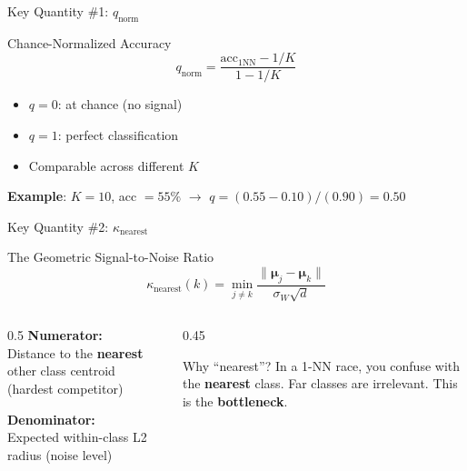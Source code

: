 \documentclass[aspectratio=169,14pt]{beamer}
\begin{document}
\begin{frame}{Key Quantity \#1: $q_{\mathrm{norm}}$}
\begin{block}{Chance-Normalized Accuracy}
\[
q_{\mathrm{norm}} = \frac{\mathrm{acc}_{1\mathrm{NN}} - 1/K}{1 - 1/K}
\]
\end{block}

\begin{itemize}
\item $q = 0$: at chance (no signal)
\item $q = 1$: perfect classification
\item Comparable across different $K$
\end{itemize}

\vspace{0.3cm}
\textbf{Example}: $K{=}10$, acc $= 55\%$ $\to$ $q = (0.55 - 0.10)/(0.90) = 0.50$
\end{frame}

\begin{frame}{Key Quantity \#2: $\kappa_{\mathrm{nearest}}$}
\begin{block}{The Geometric Signal-to-Noise Ratio}
\[
\kappa_{\mathrm{nearest}}(k) = \min_{j \neq k} \frac{\|\boldsymbol{\mu}_j - \boldsymbol{\mu}_k\|}{\sigma_W \sqrt{d}}
\]
\end{block}

\begin{columns}[T]
\begin{column}{0.5\textwidth}
\textbf{Numerator:}\\
Distance to the \textbf{nearest} other class centroid (hardest competitor)

\vspace{0.3cm}
\textbf{Denominator:}\\
Expected within-class L2 radius (noise level)
\end{column}
\begin{column}{0.45\textwidth}
\begin{alertblock}{Why ``nearest''?}
\small
In a 1-NN race, you confuse with the \textbf{nearest} class. Far classes are irrelevant. This is the \textbf{bottleneck}.
\end{alertblock}
\end{column}
\end{columns}
\end{frame}
\end{document}
